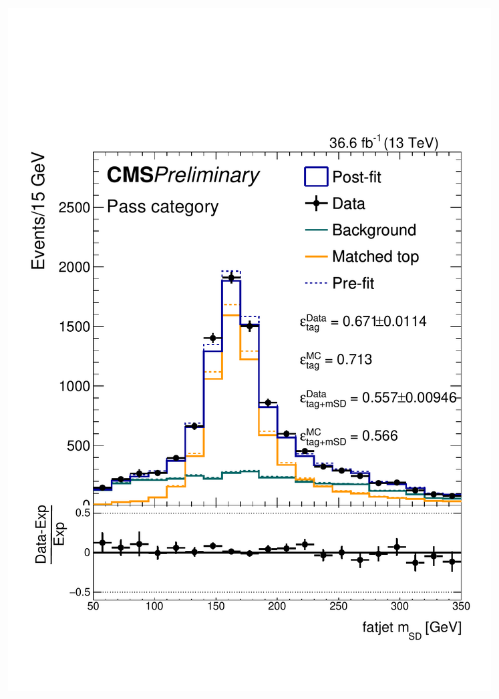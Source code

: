 \documentclass[aspectratio=169,xcolor=dvipsnames,,table,compress]{beamer}
\begin{document}
\begin{frame}
\begin{columns}
\begin{column}{0.25\textwidth}
    \end{column}
    \begin{column}{0.25\textwidth}
            \includegraphics[width=\textwidth]{../figures/toptagging/sf/loose_pass.pdf}
    \end{column}
  \end{columns}
\end{frame}
\end{document}
